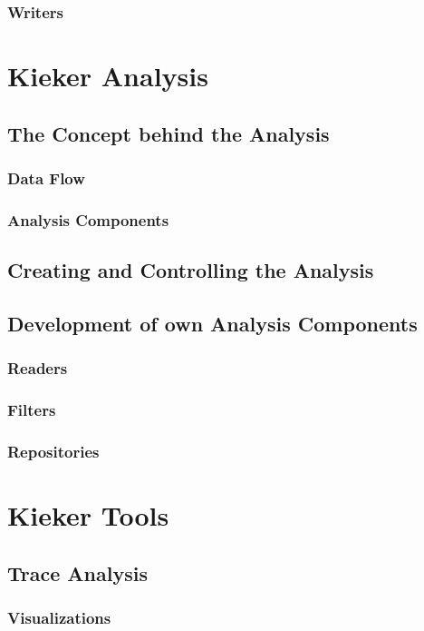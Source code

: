 \documentclass[paper=a4,twoside=false,fontsize=11pt,numbers=noenddot,version=first,bibliography=totoc,headsepline]{scrbook}
\begin{document}
			\subsection{Writers}

	\chapter{Kieker Analysis}\label{chp:Analysis}
		\section{The Concept behind the Analysis}
			\subsection{Data Flow}
			\subsection{Analysis Components}
		\section{Creating and Controlling the Analysis}
		\section{Development of own Analysis Components}
			\subsection{Readers}
			\subsection{Filters}
			\subsection{Repositories}

	\chapter{Kieker Tools}\label{chp:Tools}
		\section{Trace Analysis}
			\subsection{Visualizations}
\end{document}
